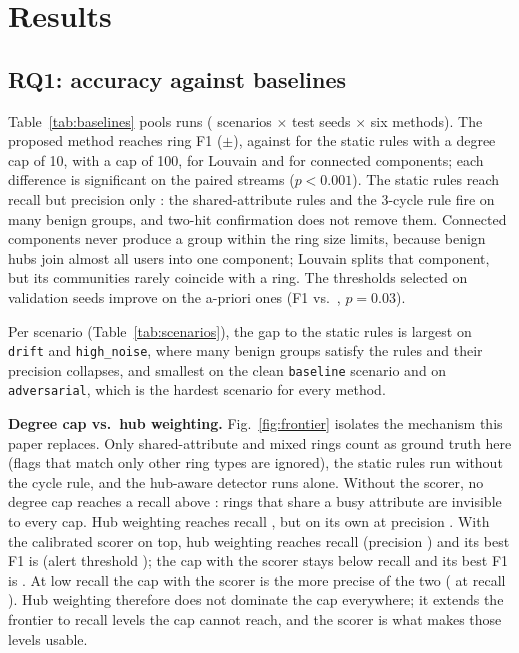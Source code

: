 \section{Results}
\label{sec:results}

\subsection{RQ1: accuracy against baselines}



Table~\ref{tab:baselines} pools \ERuns{} runs (\EScenarios{} scenarios
$\times$ \ESeeds{} test seeds $\times$ six methods). The proposed method reaches
ring F1 \EPropF{} ($\pm$\EPropFCI{}), against \ECapTenF{} for the static rules
with a degree cap of 10, \ECapHundredF{} with a cap of 100, \ELouvainF{} for
Louvain and \EPlainCCF{} for connected components; each difference is
significant on the paired streams ($p<0.001$). The static rules reach recall
\ECapTenR{} but precision only \ECapTenP{}: the shared-attribute rules and the
3-cycle rule fire on many benign groups, and two-hit confirmation does not
remove them. Connected components never produce a group within the ring size
limits, because benign hubs join almost all users into one component; Louvain
splits that component, but its communities rarely coincide with a ring. The
thresholds selected on validation seeds improve on the a-priori ones (F1
\EPropF{} vs.\ \EPropDefaultF{}, $p=0.03$).

Per scenario (Table~\ref{tab:scenarios}), the gap to the static rules is
largest on \texttt{drift} and \texttt{high\_noise}, where many benign groups
satisfy the rules and their precision collapses, and smallest on the clean
\texttt{baseline} scenario and on \texttt{adversarial}, which is the hardest
scenario for every method.

\textbf{Degree cap vs.\ hub weighting.} Fig.~\ref{fig:frontier} isolates the
mechanism this paper replaces. Only shared-attribute and mixed rings count as
ground truth here (flags that match only other ring types are ignored), the
static rules run without the cycle rule, and the hub-aware detector runs alone.
Without the scorer, no degree cap reaches a recall above \FrCapMaxR{}: rings
that share a busy attribute are invisible to every cap. Hub weighting reaches
recall \FrHubMaxR{}, but on its own at precision \FrHubPAtMaxR{}. With the
calibrated scorer on top, hub weighting reaches recall \FrHubSMaxR{} (precision
\FrHubSPAtMaxR{}) and its best F1 is \FrHubSBestF{} (alert threshold
\FrHubSBestFAt{}); the cap with the scorer stays below recall \FrCapSMaxR{} and
its best F1 is \FrCapSBestF{}. At low recall the cap with the scorer is the
more precise of the two (\FrCapSBestFP{} at recall \FrCapSBestFR{}). Hub
weighting therefore does not dominate the cap everywhere; it extends the
frontier to recall levels the cap cannot reach, and the scorer is what makes
those levels usable.

